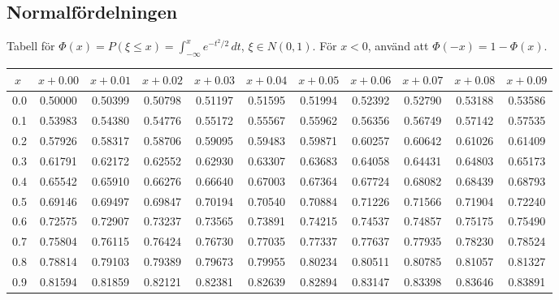 \vspace{8pt minus 6pt}
\subsection*{Normalfördelningen}

Tabell för $\Phi(x)=P(\xi\le x)=\int_{-\infty}^x e^{-t^2/2}\,dt$,  $\xi\in N(0,1)$. För $x<0$, använd att $\Phi(-x)=1-\Phi(x)$.

\def\myskip{\vspace{8pt minus 6pt}}
\medskip\begin{tabular}{|c|c|c|c|c|c|c|c|c|c|c|}
\hline
$x\;$&$x\!+\!0.00$&$x\!+\!0.01$&$x\!+\!0.02$&$x\!+\!0.03$&$x\!+\!0.04$&$x\!+\!0.05$&$x\!+\!0.06$&$x\!+\!0.07$&$x\!+\!0.08$&$x\!+\!0.09$\\\hline
0.0&0.50000&0.50399&0.50798&0.51197&0.51595&0.51994&0.52392&0.52790&0.53188&0.53586\\
0.1&0.53983&0.54380&0.54776&0.55172&0.55567&0.55962&0.56356&0.56749&0.57142&0.57535\\
0.2&0.57926&0.58317&0.58706&0.59095&0.59483&0.59871&0.60257&0.60642&0.61026&0.61409\\
0.3&0.61791&0.62172&0.62552&0.62930&0.63307&0.63683&0.64058&0.64431&0.64803&0.65173\\
0.4&0.65542&0.65910&0.66276&0.66640&0.67003&0.67364&0.67724&0.68082&0.68439&0.68793\\
0.5&0.69146&0.69497&0.69847&0.70194&0.70540&0.70884&0.71226&0.71566&0.71904&0.72240\\
0.6&0.72575&0.72907&0.73237&0.73565&0.73891&0.74215&0.74537&0.74857&0.75175&0.75490\\
0.7&0.75804&0.76115&0.76424&0.76730&0.77035&0.77337&0.77637&0.77935&0.78230&0.78524\\
0.8&0.78814&0.79103&0.79389&0.79673&0.79955&0.80234&0.80511&0.80785&0.81057&0.81327\\
0.9&0.81594&0.81859&0.82121&0.82381&0.82639&0.82894&0.83147&0.83398&0.83646&0.83891\\
\hline
\end{tabular}

